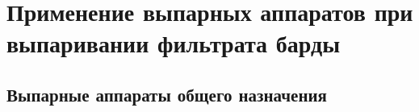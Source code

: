 \section{Применение выпарных аппаратов при выпаривании фильтрата барды}

\subsection{Выпарные аппараты общего назначения}

% 

